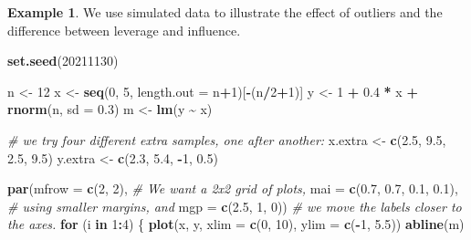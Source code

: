 \documentclass[
  a4paper,
]{article}
\newenvironment{Shaded}{\begin{snugshade}}{\end{snugshade}}
\newcommand{\AttributeTok}[1]{\textcolor[rgb]{0.13,0.29,0.53}{#1}}
\newcommand{\CommentTok}[1]{\textcolor[rgb]{0.56,0.35,0.01}{\textit{#1}}}
\newcommand{\ControlFlowTok}[1]{\textcolor[rgb]{0.13,0.29,0.53}{\textbf{#1}}}
\newcommand{\DecValTok}[1]{\textcolor[rgb]{0.00,0.00,0.81}{#1}}
\newcommand{\FloatTok}[1]{\textcolor[rgb]{0.00,0.00,0.81}{#1}}
\newcommand{\FunctionTok}[1]{\textcolor[rgb]{0.13,0.29,0.53}{\textbf{#1}}}
\newcommand{\NormalTok}[1]{#1}
\newcommand{\OtherTok}[1]{\textcolor[rgb]{0.56,0.35,0.01}{#1}}
\newcommand{\SpecialCharTok}[1]{\textcolor[rgb]{0.81,0.36,0.00}{\textbf{#1}}}
\theoremstyle{definition}
\theoremstyle{definition}
\newtheorem{example}{Example}[section]
\theoremstyle{definition}
\theoremstyle{definition}
\theoremstyle{remark}
\begin{document}
\begin{example}
We use simulated data to illustrate the effect of outliers and
the difference between leverage and influence.

\begin{Shaded}
\begin{Highlighting}[]
\FunctionTok{set.seed}\NormalTok{(}\DecValTok{20211130}\NormalTok{)}

\NormalTok{n }\OtherTok{\textless{}{-}} \DecValTok{12}
\NormalTok{x }\OtherTok{\textless{}{-}} \FunctionTok{seq}\NormalTok{(}\DecValTok{0}\NormalTok{, }\DecValTok{5}\NormalTok{, }\AttributeTok{length.out =}\NormalTok{ n}\SpecialCharTok{+}\DecValTok{1}\NormalTok{)[}\SpecialCharTok{{-}}\NormalTok{(n}\SpecialCharTok{/}\DecValTok{2}\SpecialCharTok{+}\DecValTok{1}\NormalTok{)]}
\NormalTok{y }\OtherTok{\textless{}{-}} \DecValTok{1} \SpecialCharTok{+} \FloatTok{0.4} \SpecialCharTok{*}\NormalTok{ x }\SpecialCharTok{+} \FunctionTok{rnorm}\NormalTok{(n, }\AttributeTok{sd =} \FloatTok{0.3}\NormalTok{)}
\NormalTok{m }\OtherTok{\textless{}{-}} \FunctionTok{lm}\NormalTok{(y }\SpecialCharTok{\textasciitilde{}}\NormalTok{ x)}

\CommentTok{\# we try four different extra samples, one after another:}
\NormalTok{x.extra }\OtherTok{\textless{}{-}} \FunctionTok{c}\NormalTok{(}\FloatTok{2.5}\NormalTok{, }\FloatTok{9.5}\NormalTok{, }\FloatTok{2.5}\NormalTok{, }\FloatTok{9.5}\NormalTok{)}
\NormalTok{y.extra }\OtherTok{\textless{}{-}} \FunctionTok{c}\NormalTok{(}\FloatTok{2.3}\NormalTok{, }\FloatTok{5.4}\NormalTok{, }\SpecialCharTok{{-}}\DecValTok{1}\NormalTok{, }\FloatTok{0.5}\NormalTok{)}

\FunctionTok{par}\NormalTok{(}\AttributeTok{mfrow =} \FunctionTok{c}\NormalTok{(}\DecValTok{2}\NormalTok{, }\DecValTok{2}\NormalTok{), }\CommentTok{\# We want a 2x2 grid of plots,}
    \AttributeTok{mai =} \FunctionTok{c}\NormalTok{(}\FloatTok{0.7}\NormalTok{, }\FloatTok{0.7}\NormalTok{, }\FloatTok{0.1}\NormalTok{, }\FloatTok{0.1}\NormalTok{), }\CommentTok{\# using smaller margins, and}
    \AttributeTok{mgp =} \FunctionTok{c}\NormalTok{(}\FloatTok{2.5}\NormalTok{, }\DecValTok{1}\NormalTok{, }\DecValTok{0}\NormalTok{)) }\CommentTok{\# we move the labels closer to the axes.}
\ControlFlowTok{for}\NormalTok{ (i }\ControlFlowTok{in} \DecValTok{1}\SpecialCharTok{:}\DecValTok{4}\NormalTok{) \{}
    \FunctionTok{plot}\NormalTok{(x, y, }\AttributeTok{xlim =} \FunctionTok{c}\NormalTok{(}\DecValTok{0}\NormalTok{, }\DecValTok{10}\NormalTok{), }\AttributeTok{ylim =} \FunctionTok{c}\NormalTok{(}\SpecialCharTok{{-}}\DecValTok{1}\NormalTok{, }\FloatTok{5.5}\NormalTok{))}
    \FunctionTok{abline}\NormalTok{(m)}


\end{Highlighting}
\end{Shaded}
\end{example}
\end{document}
